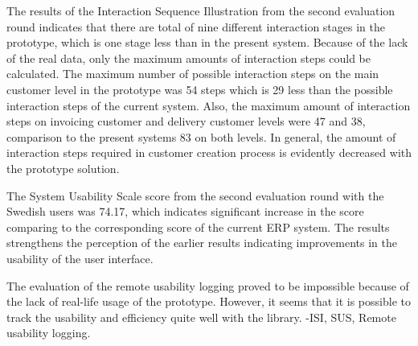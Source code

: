\documentclass[12pt,a4paper,oneside,pdftex]{report}
\begin{document}
The results of the Interaction Sequence Illustration from the second evaluation round indicates that there are total of nine different interaction stages in the prototype, which is one stage less than in the present system. Because of the lack of the real data, only the maximum amounts of interaction steps could be calculated. The maximum number of possible interaction steps on the main customer level in the prototype was 54 steps which is  29 less than the possible interaction steps of the current system. Also, the maximum amount of interaction steps on invoicing customer and delivery customer levels were 47 and 38, comparison to the present systems 83 on both levels. In general, the amount of interaction steps required in customer creation process is evidently decreased with the prototype solution.

 The System Usability Scale score from the second evaluation round with the Swedish users was 74.17, which indicates significant increase in the score comparing to the corresponding score of the current ERP system. The results strengthens the perception of the earlier results indicating improvements in the usability of the user interface. 
 
 The evaluation of the remote usability logging proved to be impossible because of the lack of real-life usage of the prototype. However, it seems that it is possible to track the usability and efficiency quite well with the library.
-ISI, SUS, Remote usability  logging.






    
\end{document}
